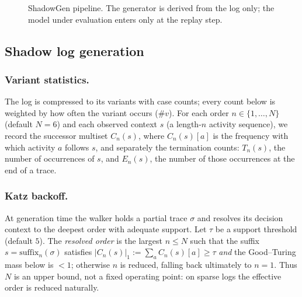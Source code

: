 \documentclass[runningheads]{llncs}
\newcommand{\genshadow}{\ensuremath{\mathit{Gen}_{\mathit{shadow}}}}
\newcommand{\genaccept}{\ensuremath{\mathit{Gen}_{\mathit{accept}}}}
\newcommand{\punseen}{\ensuremath{p_{\mathit{unseen}}}}
\newcommand{\pend}{\ensuremath{p_{\mathit{end}}}}
\begin{document}
\begin{figure}[t]
\centering
{}
\caption{ShadowGen pipeline. The generator is derived from the log only; the model under evaluation enters only at the replay step.}
\label{fig:pipeline}
\end{figure}

\subsection{Shadow log generation}
\label{sec:method:gen}

\subsubsection{Variant statistics.}
The log is compressed to its variants with case counts; every count below is weighted by how often the variant occurs ($\#v$). For each order $n\in\{1,\dots,N\}$ (default $N{=}6$) and each observed context $s$ (a length-$n$ activity sequence), we record the successor multiset $C_n(s)$, where $C_n(s)[a]$ is the frequency with which activity $a$ follows $s$, and separately the termination counts: $T_n(s)$, the number of occurrences of $s$, and $E_n(s)$, the number of those occurrences at the end of a trace.

\subsubsection{Katz backoff.}
At generation time the walker holds a partial trace $\sigma$ and resolves its decision context to the deepest order with adequate support. Let $\tau$ be a support threshold (default $5$). The \emph{resolved order} is the largest $n\le N$ such that the suffix $s=\mathrm{suffix}_n(\sigma)$ satisfies $|C_n(s)|_1 := \sum_a C_n(s)[a] \ge \tau$ \emph{and} the Good--Turing mass below is $<1$; otherwise $n$ is reduced, falling back ultimately to $n{=}1$. Thus $N$ is an upper bound, not a fixed operating point: on sparse logs the effective order is reduced naturally.
\end{document}
